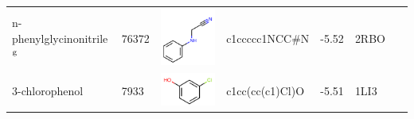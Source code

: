 \documentclass[aps,pre,twocolumn,nofootinbib,superscriptaddress,10pt, final,tightenlines]{revtex4-1}
\begin{document}
\begin{table}
\begin{center}
\begin{tabular}{llp{2cm}>{\ttfamily}lS[table-format=-1.2, table-figures-uncertainty=1]ll}
n-phenylglycinonitrile$^{\rm g}$   & 76372                                & \parbox[c]{1em}{\includegraphics[scale=0.2]{figures/76372.pdf}}    & c1ccccc1NCC\#N                       & -5.52                                            & 2RBO~\cite{boyce_predicting_2009} & \cite{boyce_predicting_2009}  \\ 
3-chlorophenol                     & 7933                                 & \parbox[c]{1em}{\includegraphics[scale=0.2]{figures/7933.pdf}}     & c1cc(cc(c1)Cl)O                      & -5.51                                                   & 1LI3~\cite{wei_model_2002}        & \cite{wei_model_2002}         \\ 

\end{tabular}
\end{center}
\end{table}
\end{document}
